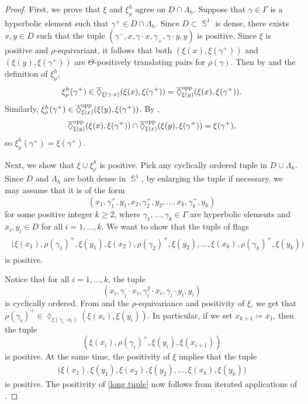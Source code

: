 \documentclass{amsart}
\theoremstyle{plain}
\theoremstyle{definition}
\DeclareMathOperator{\Diam}{\lozenge}
\DeclareMathOperator{\Sb}{\mathbb{S}}
\newcommand{\1}{\mathbf{1}}
\begin{document}
\begin{proof}
First, we prove that $\xi$ and $\xi^h_\rho$ agree on $D\cap\Lambda_h$. Suppose that $\gamma\in\Gamma$ is a hyperbolic element such that $\gamma^+\in D\cap\Lambda_h$. Since $D\subset\Sb^1$ is dense, there exists $x,y\in D$ such that the tuple $(\gamma^-,x,\gamma\cdot x,\gamma_+,\gamma\cdot y,y)$ is positive. Since $\xi$ is positive and $\rho$-equivariant, it follows that both $(\xi(x),\xi(\gamma^+))$ and $(\xi(y),\xi(\gamma^+))$ are $\Theta$-positively translating pairs for $\rho(\gamma)$. Then by  and the definition of $\xi^h_\rho$, 
\[\xi^h_\rho(\gamma^+)\in\overline{\Diam}_{\xi(\gamma\cdot x)}(\xi(x),\xi(\gamma^+))=\overline{\Diam}_{\xi(y)}^{\rm opp}(\xi(x),\xi(\gamma^+)).\]
Similarly, $\xi^h_\rho(\gamma^+)\in\overline{\Diam}_{\xi(x)}^{\rm opp}(\xi(y),\xi(\gamma^+))$. By , 
\[\overline{\Diam}_{\xi(y)}^{\rm opp}(\xi(x),\xi(\gamma^+))\cap\overline{\Diam}_{\xi(x)}^{\rm opp}(\xi(y),\xi(\gamma^+))=\xi(\gamma^+),\]
so $\xi^h_\rho(\gamma^+)=\xi(\gamma^+)$.

Next, we show that $\xi\cup\xi^h_\rho$ is positive. Pick any cyclically ordered tuple in $D\cup\Lambda_h$. Since $D$ and $\Lambda_h$ are both dense in $\Sb^1$, by enlarging the tuple if necessary, we may assume that it is of the form
\[(x_1,\gamma_1^+,y_1,x_2,\gamma_2^+,y_2,\dots,x_k,\gamma_k^+,y_k)\]
for some positive integer $k\ge 2$, where $\gamma_1,\dots,\gamma_k\in\Gamma$ are hyperbolic elements and $x_i,y_i\in D$ for all $i=1,\dots,k$. We want to show that the tuple of flags
\begin{align}\label{long tuple}
\begin{split}
\big(\xi(x_1),\rho(\gamma_1)^+,\xi(y_1),\xi(x_2),\rho(\gamma_2)^+,\xi(y_2),\dots,\xi(x_k),\rho(\gamma_k)^+,\xi(y_k)\big)
\end{split}
\end{align}
is positive. 

Notice that for all $i=1,\dots,k$, the tuple 
    \[(x_i,\gamma_i\cdot x_i,\gamma_i^2\cdot x_i,\gamma_i\cdot y_i,y_i)\] 
    is cyclically ordered. From  and the $\rho$-equivariance and positivity of $\xi$, we get that $\rho(\gamma_i)^+ \in \Diam_{\xi(\gamma_i \cdot x_i)}(\xi(x_i),\xi(y_i))$. In particular, if we set $x_{k+1}\coloneqq x_1$, then the tuple
    \[(\xi(x_i),\rho(\gamma_i)^+, \xi(y_i),\xi(x_{i+1}))\]
    is positive. At the same time, the positivity of $\xi$ implies that the tuple
\begin{align*}
\big(\xi(x_1),\xi(y_1),\xi(x_2),\xi(y_2),\dots,\xi(x_k),\xi(y_k)\big)
\end{align*}
is positive. The positivity of \eqref{long tuple} now follows from iterated applications of .
\end{proof}
\end{document}
